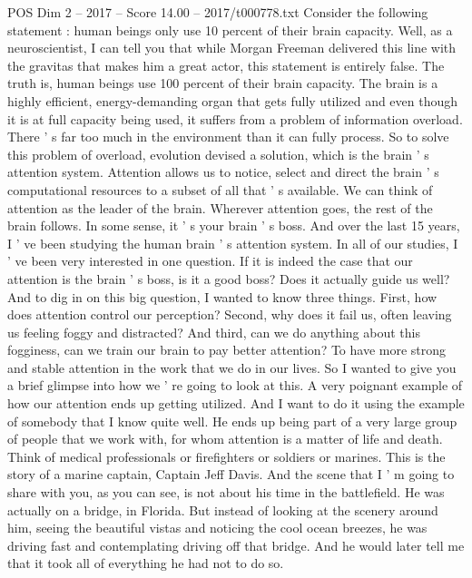 \begin{textsample}{POS Dim 2 – 2017 – Score 14.00 – 2017/t000778.txt}  \label{ex:f2_pos_046}
Consider the following statement : human beings only use 10 percent of their brain capacity.
Well, as a neuroscientist, I can tell you that while Morgan Freeman delivered this line with the gravitas that makes him a great actor, this statement is entirely false.
The truth is, human beings use 100 percent of their brain capacity.
The brain is a highly efficient, energy-demanding organ that gets fully utilized and even though it is at full capacity being used, it suffers from a problem of information overload.
There ' s far too much in the environment than it can fully process.
So to solve this problem of overload, evolution devised a solution, which is the brain ' s attention system.
Attention allows us to notice, select and direct the brain ' s computational resources to a subset of all that ' s available.
We can think of attention as the leader of the brain.
Wherever attention goes, the rest of the brain follows.
In some sense, it ' s your brain ' s boss.
And over the last 15 years, I ' ve been studying the human brain ' s attention system.
In all of our studies, I ' ve been very interested in one question.
If it is indeed the case that our attention is the brain ' s boss, is it a good boss?
Does it actually guide us well?
And to dig in on this big question, I wanted to know three things.
First, how does attention control our perception?
Second, why does it fail us, often leaving us feeling foggy and distracted?
And third, can we do anything about this fogginess, can we train our brain to pay better attention?
To have more strong and stable attention in the work that we do in our lives.
So I wanted to give you a brief glimpse into how we ' re going to look at this.
A very poignant example of how our attention ends up getting utilized.
And I want to do it using the example of somebody that I know quite well.
He ends up being part of a very large group of people that we work with, for whom attention is a matter of life and death.
Think of medical professionals or firefighters or soldiers or marines.
This is the story of a marine captain, Captain Jeff Davis.
And the scene that I ' m going to share with you, as you can see, is not about his time in the battlefield.
He was actually on a bridge, in Florida.
But instead of looking at the scenery around him, seeing the beautiful vistas and noticing the cool ocean breezes, he was driving fast and contemplating driving off that bridge.
And he would later tell me that it took all of everything he had not to do so.

\end{textsample}
